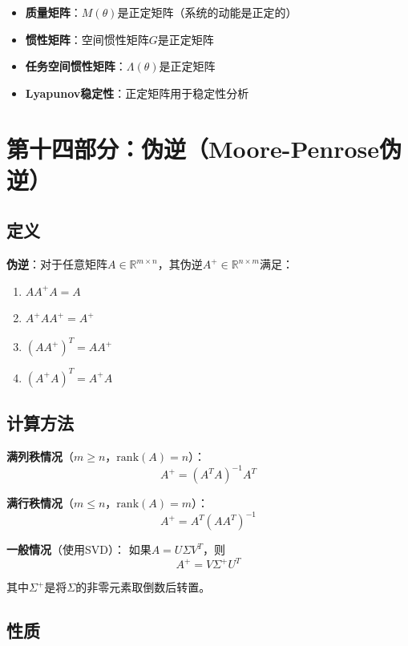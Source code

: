 \documentclass[12pt,a4paper]{article}
\begin{document}
\begin{itemize}
\item \textbf{质量矩阵}：$M(\theta)$是正定矩阵（系统的动能是正定的）
\item \textbf{惯性矩阵}：空间惯性矩阵$G$是正定矩阵
\item \textbf{任务空间惯性矩阵}：$\Lambda(\theta)$是正定矩阵
\item \textbf{Lyapunov稳定性}：正定矩阵用于稳定性分析
\end{itemize}

\section{第十四部分：伪逆（Moore-Penrose伪逆）}

\subsection{定义}

\textbf{伪逆}：对于任意矩阵$A \in \mathbb{R}^{m \times n}$，其伪逆$A^+ \in \mathbb{R}^{n \times m}$满足：

\begin{enumerate}
\item $AA^+A = A$
\item $A^+AA^+ = A^+$
\item $(AA^+)^T = AA^+$
\item $(A^+A)^T = A^+A$
\end{enumerate}

\subsection{计算方法}

\textbf{满列秩情况}（$m \geq n$，$\text{rank}(A) = n$）：
\begin{equation}
A^+ = (A^T A)^{-1} A^T
\end{equation}

\textbf{满行秩情况}（$m \leq n$，$\text{rank}(A) = m$）：
\begin{equation}
A^+ = A^T (AA^T)^{-1}
\end{equation}

\textbf{一般情况}（使用SVD）：
如果$A = U \Sigma V^T$，则
\begin{equation}
A^+ = V \Sigma^+ U^T
\end{equation}

其中$\Sigma^+$是将$\Sigma$的非零元素取倒数后转置。

\subsection{性质}
\end{document}
